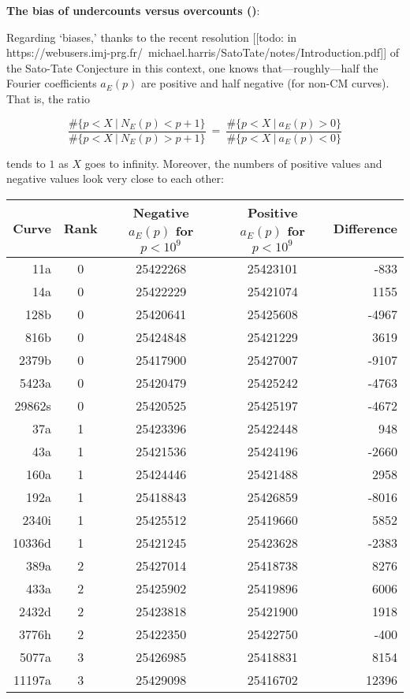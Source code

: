 \documentclass[11pt]{article}
\theoremstyle{plain}
\theoremstyle{definition}
\numberwithin{equation}{section}
\numberwithin{figure}{section}
\numberwithin{table}{section}
\begin{document}
 {\bf The bias of undercounts versus overcounts  (\cite{S})}:

 Regarding `biases,'  thanks to the recent resolution \cite{} [[todo: in https://webusers.imj-prg.fr/~michael.harris/SatoTate/notes/Introduction.pdf]] of the Sato-Tate Conjecture in this context, one knows that---roughly---half the Fourier coefficients  $a_E(p)$ are positive and half negative (for non-CM curves). That is,  the ratio

 $${\frac{\#\{p < X \ | \ N_E(p) < p+1 \}} {\#\{p < X \ | \ N_E(p) > p+1 \}}}\ =\ {\frac{\#\{p < X \ | \ a_E(p) > 0 \}} {\#\{p < X \ | \ a_E(p) < 0 \}}}$$

 tends to $1$ as $X$ goes to infinity. Moreover, the numbers of positive values and negative values look very close to each other:
\vskip20pt


\begin{center}
\begin{tabular} {r | c | c | c | r}\hline
Curve & Rank & Negative $a_E(p)$ for $p<10^9$ & Positive $a_E(p)$ for $p<10^9$ & Difference\\ \hline\hline
11a    & 0      & 25422268       & 25423101     &   -833 \\ \hline
14a    & 0      & 25422229       & 25421074     &   1155 \\ \hline
128b   & 0      & 25420641       & 25425608     &   -4967 \\ \hline
816b   & 0      & 25424848       & 25421229     &   3619 \\ \hline
2379b  & 0      & 25417900       & 25427007     &   -9107 \\ \hline
5423a  & 0      & 25420479       & 25425242     &   -4763 \\ \hline
29862s & 0      & 25420525       & 25425197     &   -4672 \\ \hline
37a    & 1      & 25423396       & 25422448     &   948 \\ \hline
43a    & 1      & 25421536       & 25424196     &   -2660 \\ \hline
160a   & 1      & 25424446       & 25421488     &   2958 \\ \hline
192a   & 1      & 25418843       & 25426859     &   -8016 \\ \hline
2340i  & 1      & 25425512       & 25419660     &   5852 \\ \hline
10336d & 1      & 25421245       & 25423628     &   -2383 \\ \hline
389a   & 2      & 25427014       & 25418738     &   8276 \\ \hline
433a   & 2      & 25425902       & 25419896     &   6006 \\ \hline
2432d  & 2      & 25423818       & 25421900     &   1918 \\ \hline
3776h  & 2      & 25422350       & 25422750     &   -400 \\ \hline
5077a  & 3      & 25426985       & 25418831     &   8154 \\ \hline
11197a & 3      & 25429098       & 25416702     &   12396 \\ \hline
\end{tabular}
\end{center}
\end{document}
